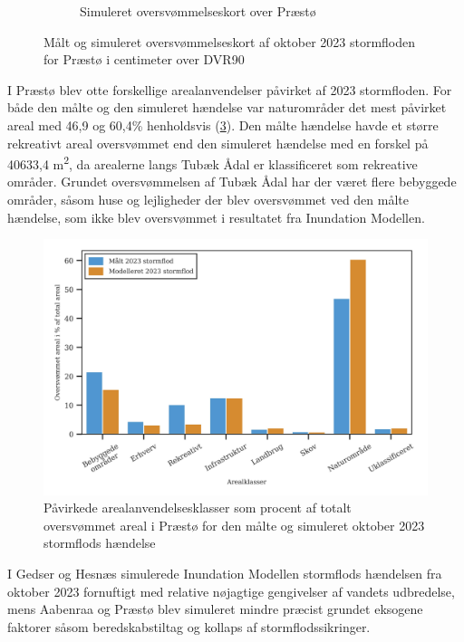 \begin{figure}[H]
\begin{subfigure}[t]{0.5\textwidth}
        \caption{Simuleret oversvømmelseskort over Præstø}
        \label{Subfig: Model Præstø}
    \end{subfigure}
    \caption{Målt og simuleret oversvømmelseskort af oktober 2023 stormfloden for Præstø i centimeter over DVR90}
    \label{Figur: Målt & simuleret Præstø}
\end{figure}

I Præstø blev otte forskellige arealanvendelser påvirket af 2023 stormfloden. For både den målte og den simuleret hændelse var naturområder det mest påvirket areal med 46,9 og 60,4\% henholdsvis (\ref{Figur: Påvirket arealanvendelse Præstø}). Den målte hændelse havde et større rekreativt areal oversvømmet end den simuleret hændelse med en forskel på 40633,4 m\textsuperscript{2}, da arealerne langs Tubæk Ådal er klassificeret som rekreative områder. Grundet oversvømmelsen af Tubæk Ådal har der været flere bebyggede områder, såsom huse og lejligheder der blev oversvømmet ved den målte hændelse, som ikke blev oversvømmet i resultatet fra Inundation Modellen. 

\begin{figure}[H]
    \centering
    \includegraphics[width=0.8\linewidth]{images/Resultater/areal_anvendelses_grafer/praestoe_arealanvendelse.jpg}
    \caption{Påvirkede arealanvendelsesklasser som procent af totalt oversvømmet areal i Præstø for den målte og simuleret oktober 2023 stormflods hændelse}
    \label{Figur: Påvirket arealanvendelse Præstø}
\end{figure}

I Gedser og Hesnæs simulerede Inundation Modellen stormflods hændelsen fra oktober 2023 fornuftigt med relative nøjagtige gengivelser af vandets udbredelse, mens Aabenraa og Præstø blev simuleret mindre præcist grundet eksogene faktorer såsom beredskabstiltag og kollaps af stormflodssikringer. 

